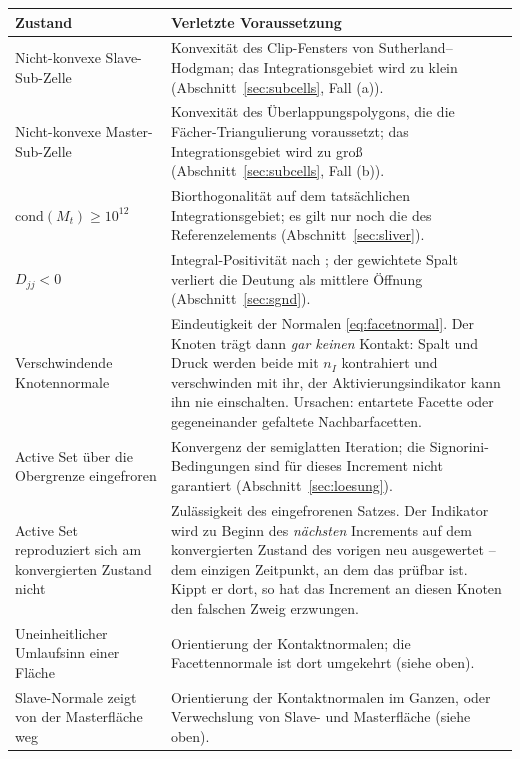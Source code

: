 \documentclass[a4paper,11pt]{article}
\def\bm#1{#1}%
\def\tilde#1{#1}%
\begin{document}
\begin{center}
\small
\begin{tabularx}{\linewidth}{lX}
\toprule
Zustand & Verletzte Voraussetzung \\
\midrule
Nicht-konvexe Slave-Sub-Zelle & Konvexität des Clip-Fensters von Sutherland--Hodgman; das
Integrationsgebiet wird zu klein (Abschnitt~\ref{sec:subcells}, Fall (a)). \\
Nicht-konvexe Master-Sub-Zelle & Konvexität des Überlappungspolygons, die die Fächer-Triangulierung
voraussetzt; das Integrationsgebiet wird zu groß (Abschnitt~\ref{sec:subcells}, Fall (b)). \\
$\mathrm{cond}(\bm M_t)\ge10^{12}$ & Biorthogonalität auf dem tatsächlichen Integrationsgebiet;
es gilt nur noch die des Referenzelements (Abschnitt~\ref{sec:sliver}). \\
$\tilde D_{jj}<0$ & Integral-Positivität nach \citet[Gl.~(4.2)]{popp2012}; der gewichtete Spalt
verliert die Deutung als mittlere Öffnung (Abschnitt~\ref{sec:sgnd}). \\
Verschwindende Knotennormale & Eindeutigkeit der Normalen \eqref{eq:facetnormal}. Der Knoten
trägt dann \emph{gar keinen} Kontakt: Spalt und Druck werden beide mit $\bm n_I$ kontrahiert und
verschwinden mit ihr, der Aktivierungsindikator kann ihn nie einschalten. Ursachen: entartete
Facette oder gegeneinander gefaltete Nachbarfacetten. \\
Active Set über die Obergrenze eingefroren & Konvergenz der semiglatten Iteration; die
Signorini-Bedingungen sind für dieses Increment nicht garantiert
(Abschnitt~\ref{sec:loesung}). \\
Active Set reproduziert sich am konvergierten Zustand nicht & Zulässigkeit des eingefrorenen
Satzes. Der Indikator wird zu Beginn des \emph{nächsten} Increments auf dem konvergierten Zustand
des vorigen neu ausgewertet -- dem einzigen Zeitpunkt, an dem das prüfbar ist. Kippt er dort, so
hat das Increment an diesen Knoten den falschen Zweig erzwungen. \\
Uneinheitlicher Umlaufsinn einer Fläche & Orientierung der Kontaktnormalen; die Facettennormale
ist dort umgekehrt (siehe oben). \\
Slave-Normale zeigt von der Masterfläche weg & Orientierung der Kontaktnormalen im Ganzen, oder
Verwechslung von Slave- und Masterfläche (siehe oben). \\
\bottomrule
\end{tabularx}
\end{center}
\end{document}
